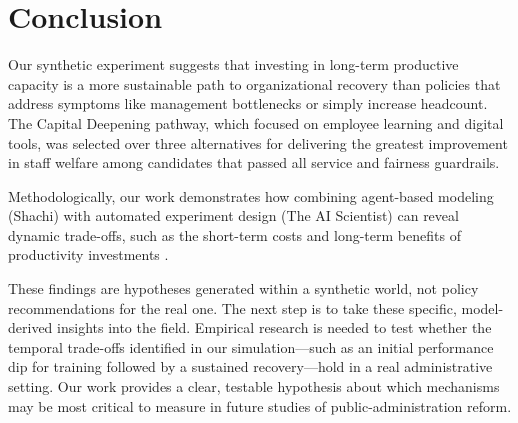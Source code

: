 \documentclass{article}
\begin{document}
\section{Conclusion}
Our synthetic experiment suggests that investing in long-term productive capacity is a more sustainable path to organizational recovery than policies that address symptoms like management bottlenecks or simply increase headcount. The Capital Deepening pathway, which focused on employee learning and digital tools, was selected over three alternatives for delivering the greatest improvement in staff welfare among candidates that passed all service and fairness guardrails.

Methodologically, our work demonstrates how combining agent-based modeling (Shachi) with automated experiment design (The AI Scientist) can reveal dynamic trade-offs, such as the short-term costs and long-term benefits of productivity investments \citep{lu2024aiscientist,kuroki2025shachi}.

These findings are hypotheses generated within a synthetic world, not policy recommendations for the real one. The next step is to take these specific, model-derived insights into the field. Empirical research is needed to test whether the temporal trade-offs identified in our simulation---such as an initial performance dip for training followed by a sustained recovery---hold in a real administrative setting. Our work provides a clear, testable hypothesis about which mechanisms may be most critical to measure in future studies of public-administration reform.



\end{document}
